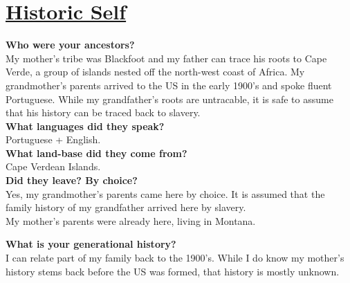 \documentclass{article}
\title{\mytitle}
\author{\myauthor}
\newcommand{\hsp}{\hspace{5mm}}
\begin{document}
\maketitle


\center\section*{\underline{Historic Self}}\vspace{3mm}
\begin{minipage}[t]{1.0\linewidth}
    \begin{minipage}[t]{0.45\linewidth}
        \textbf{Who were your ancestors?}\vspace{1mm}\\
        My mother's tribe was Blackfoot and my father can trace his roots to Cape
        Verde, a group of islands nested off the north-west coast of Africa. My grandmother's parents arrived to the US in the early 1900's and 
        spoke fluent Portuguese. While my grandfather's roots are untracable, it is 
        safe to assume that his history can be traced back to slavery.\\

        \textbf{What languages did they speak?}\vspace{1mm}\\
        Portuguese + English.\\

        \textbf{What land-base did they come from?}\vspace{1mm}\\
        Cape Verdean Islands.\\

        \textbf{Did they leave? By choice?}\vspace{1mm}\\
        Yes, my grandmother's parents came here by choice. It is assumed that
        the family history of my grandfather arrived here by slavery.\\
    
        My mother's parents were already here, living in Montana.\\
    \end{minipage}\hsp
    \begin{minipage}[t]{0.45\linewidth}
        \textbf{What is your generational history?}\vspace{1mm}\\
        I can relate part of my family back to the 1900's. While I do know my 
        mother's history stems back before the US was formed, that history is 
        mostly unknown.\\


\end{minipage}
\end{minipage}
\end{document}
